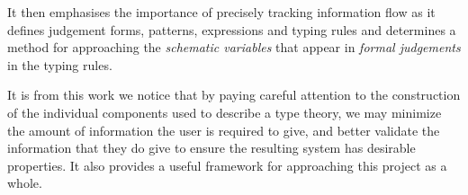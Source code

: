 It then emphasises the importance of precisely tracking information
flow as it defines judgement forms, patterns, expressions and typing
rules and determines a method for approaching the \emph{schematic
  variables} that appear in \emph{formal judgements} in the typing
rules.

It is from this work we notice that by paying
careful attention to the construction of the individual components used to
describe a type theory, we may minimize the amount of information
the user is required to give, and better validate the information that
they do give to ensure the resulting system has desirable
properties. It also provides a useful framework for approaching
this project as a whole.

